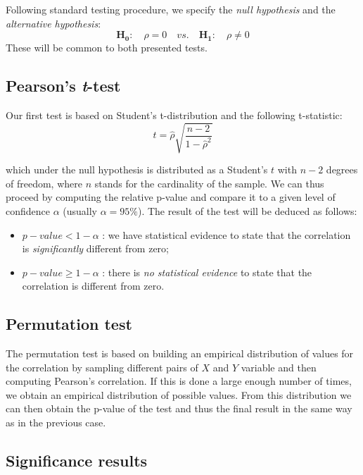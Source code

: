 Following standard testing procedure, we specify the \textit{null hypothesis} and the \textit{alternative hypothesis}:
\begin{equation*}
	\mathbf{H_{0}}: \quad \rho = 0 \quad vs. \quad	\mathbf{H_{1}}: \quad \rho \neq 0
\end{equation*}
These will be common to both presented tests.

\subsection{Pearson's \textit{t}-test}
Our first test is based on Student's t-distribution and the following t-statistic:
\begin{equation}
	t = \hat{\rho} \sqrt{\frac{n - 2}{1 - \hat{\rho}^2}}
\end{equation} 

which under the null hypothesis is distributed as a Student's $t$ with $n-2$ degrees of freedom, where $n$ stands for the cardinality of the sample.
We can thus proceed by computing the relative p-value and compare it to a given level of confidence $\alpha$ (usually $\alpha = 95\%$). 
The result of the test will be deduced as follows:
\begin{itemize}
	\item $p-value < 1 - \alpha$ : we have statistical evidence to state that the correlation is \textit{significantly} different from zero;
	\item $p-value \geq 1 - \alpha$ : there is \textit{no statistical evidence} to state that the correlation is different from zero.
\end{itemize}


\subsection{Permutation test}
 The permutation test is based on building an empirical distribution of values for the correlation by sampling different pairs of $X$ and $Y$ variable and then computing Pearson's correlation. If this is done a large enough number of times, we obtain an empirical distribution of possible values. 
 From this distribution we can then obtain the p-value of the test and thus the final result in the same way as in the previous case.
 

\subsection{Significance results}



